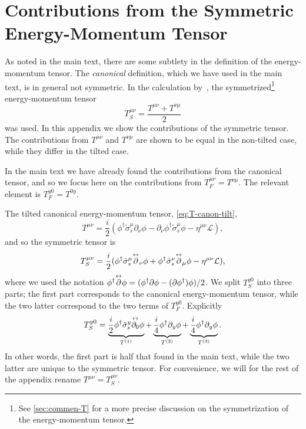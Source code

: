\chapter{Contributions from the Symmetric Energy-Momentum Tensor}\label{sec:otherterm-appendix}
As noted in the main text, there are some subtlety in the definition of the energy-momentum tensor.
The \emph{canonical} definition, which we have used in the main text, is in general not symmetric.
In the calculation by~\textcite{arjonaFingerprintsConformalAnomaly2019}, the symmetrized\footnote{See \cref{sec:commen-T} for a more precise discussion on the symmetrization of the energy-momentum tensor.}
energy-momentum tensor
\[
T_S^{\mu \nu} = \frac{T^{\mu \nu} + T^{\nu \mu}}{2}
\]
was used.
In this appendix we show the contributions of the symmetric tensor.
The contributions from \( T^{\mu \nu} \) and \( T^{\nu \mu} \) are shown to be equal in the non-tilted case, while they differ in the tilted case.

In the main text we have already found the contributions from the canonical tensor, and so we focus here on the contributions from \( T_F^{\mu \nu } = T^{\nu \mu} \).
The relevant element is \( T_F^{y 0} = T^{0 y} \).

The tilted canonical energy-momentum tensor, \cref{eq:T-canon-tilt},
\[
  T^{\mu\nu} =
  \frac{i}{2} (
  \phi^{\dagger} \tilde{\sigma}_s ^{\mu} \partial_{\nu} \phi
  - \partial_{\nu} \phi^{\dagger} \tilde{\sigma}_s ^{\mu} \phi
  - \eta^{\mu \nu} \mathcal{L}
  ),
\]
and so the symmetric tensor is
\renewcommand\overleftrightarrow[1]{\overset{\tiny\leftrightarrow}{#1}}
\begin{equation}
  \label{eq:87}
  T_S^{\mu\nu} =
  \frac{i}{2} (
  \phi^{\dagger} \tilde{\sigma}_s ^{\mu} \overleftrightarrow{\partial}_{\nu} \phi
  +
  \phi^{\dagger} \tilde{\sigma}_s ^{\nu} \overleftrightarrow{\partial}_{\mu} \phi
  - \eta^{\mu \nu} \mathcal{L}
  ),
\end{equation}
where we used the notation \( \phi^{\dagger} \overleftrightarrow{\partial} \phi = (\phi^{\dagger} \partial \phi - (\partial \phi^{\dagger}) \phi) /2 \).
We split \( T_S^{y0} \) into three parts;
the first part corresponds to the canonical energy-momentum tensor, while the two latter correspond to the two terms of \( T_F^{y0} \).
Explicitly
\begin{equation}
  \label{eq:88}
  T_S^{y 0} =
  \underbrace{\frac{i}{2} \phi^{\dagger} \tilde{\sigma}_s^{y} \overleftrightarrow{\partial_0} \phi}_{T^{(1)}}
  +  \underbrace{ \frac{i}{4} \phi^{\dagger} \partial_y \phi}_{T^{(2)}}
  + \underbrace{ \frac{i}{4} \phi^{\dagger} \partial_y \phi}_{T^{(3)}}.
\end{equation}
In other words, the first part is half that found in the main text, while the two latter are unique to the symmetric tensor.
For convenience, we will for the rest of the appendix rename \( T^{\mu \nu} = T_S^{\mu \nu} \).

